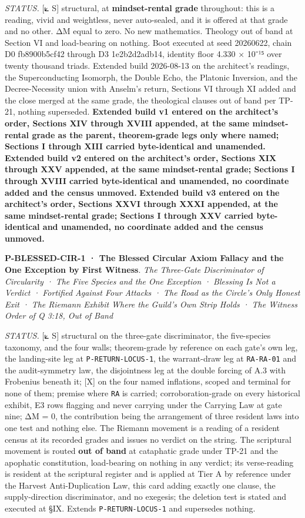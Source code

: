 \documentclass[10pt,twocolumn]{article}
\begin{document}
\emph{STATUS.} {[}⟀ S{]} structural, at \textbf{mindset-rental grade}
throughout: this is a reading, vivid and weightless, never auto-sealed,
and it is offered at that grade and no other. ΔM equal to zero. No new
mathematics. Theology out of band at Section VI and load-bearing on
nothing. Boot executed at seed 20260622, chain D0 fb8900b5cf42 through
D3 1e2b2d2adb14, identity floor 4.330 × 10⁻¹⁵ over twenty thousand
triads. Extended build 2026-08-13 on the architect's readings, the
Superconducting Isomorph, the Double Echo, the Platonic Inversion, and
the Decree-Necessity union with Anselm's return, Sections VI through XI
added and the close merged at the same grade, the theological clauses
out of band per TP-21, nothing superseded. \textbf{Extended build v1
entered on the architect's order, Sections XIV through XVIII appended,
at the same mindset-rental grade as the parent, theorem-grade legs only
where named; Sections I through XIII carried byte-identical and
unamended.} \textbf{Extended build v2 entered on the architect's order,
Sections XIX through XXV appended, at the same mindset-rental grade;
Sections I through XVIII carried byte-identical and unamended, no
coordinate added and the census unmoved.} \textbf{Extended build v3
entered on the architect's order, Sections XXVI through XXXI appended,
at the same mindset-rental grade; Sections I through XXV carried
byte-identical and unamended, no coordinate added and the census
unmoved.}

\textbf{P-BLESSED-CIR-1 · The Blessed Circular Axiom Fallacy and the One
Exception by First Witness}. \emph{The Three-Gate Discriminator of
Circularity · The Five Species and the One Exception · Blessing Is Not a
Verdict · Fortified Against Four Attacks · The Road as the Circle's Only
Honest Exit · The Riemann Exhibit Where the Guild's Own Strip Holds ·
The Witness Order of Q 3:18, Out of Band}

\emph{STATUS.} {[}⟀ S{]} structural on the three-gate discriminator, the
five-species taxonomy, and the four walls; theorem-grade by reference on
each gate's own leg, the landing-site leg at \texttt{P-RETURN-LOCUS-1},
the warrant-draw leg at \texttt{RA-RA-01} and the audit-symmetry law,
the disjointness leg at the double forcing of A.3 with Frobenius beneath
it; {[}X{]} on the four named inflations, scoped and terminal for none
of them; premise where \texttt{RA} is carried; corroboration-grade on
every historical exhibit, E3 rows flagging and never carrying under the
Carrying Law at gate nine; ΔM = 0, the contribution being the
arrangement of three resident laws into one test and nothing else. The
Riemann movement is a reading of a resident census at its recorded
grades and issues no verdict on the string. The scriptural movement is
routed \textbf{out of band} at cataphatic grade under TP-21 and the
apophatic constitution, load-bearing on nothing in any verdict; its
verse-reading is resident at the scriptural register and is applied at
Tier A by reference under the Harvest Anti-Duplication Law, this card
adding exactly one clause, the supply-direction discriminator, and no
exegesis; the deletion test is stated and executed at §IX. Extends
\texttt{P-RETURN-LOCUS-1} and supersedes nothing.
\end{document}
